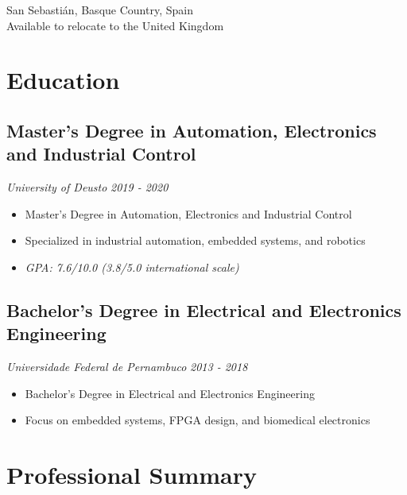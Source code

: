 \documentclass[11pt,a4paper]{article}
\begin{document}
\begin{center}
\begin{minipage}[t]{0.7\textwidth}
\begin{flushleft}
            \vspace{0.5em}
            \begin{center}
                \color{white} \color{white} San Sebastián, Basque Country, Spain \\
                \color{white} Available to relocate to the United Kingdom
            \end{center}
        \end{flushleft}
    \end{minipage}
\end{center}

\vspace{2.5em}

\vspace{1em}

\section{Education}

\subsection{Master's Degree in Automation, Electronics and Industrial Control}
\textit{University of Deusto} \hfill \textit{2019 - 2020}
\begin{itemize}
    \item Master's Degree in Automation, Electronics and Industrial Control
    \item Specialized in industrial automation, embedded systems, and robotics
    \item \textit{GPA: 7.6/10.0 (3.8/5.0 international scale)}
\end{itemize}

\subsection{Bachelor's Degree in Electrical and Electronics Engineering}
\textit{Universidade Federal de Pernambuco} \hfill \textit{2013 - 2018}
\begin{itemize}
    \item Bachelor's Degree in Electrical and Electronics Engineering
    \item Focus on embedded systems, FPGA design, and biomedical electronics
\end{itemize}

\section{Professional Summary}
\resumo
\end{document}

